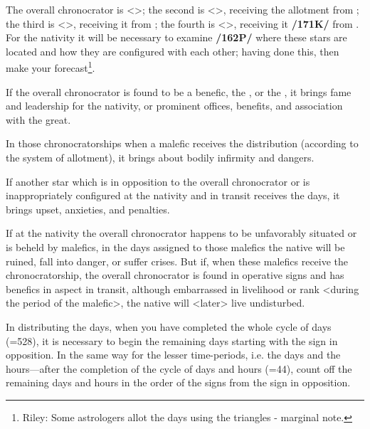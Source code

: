 The overall chronocrator is \Jupiter\xspace <\Pisces>; the second is \Mercury\xspace <\Gemini>, receiving the allotment from \Jupiter; the third is \Mars <\Scorpio>, receiving it from \Mercury; the fourth is \Venus <\Taurus>, receiving it \textbf{/171K/} from \Mars. For the nativity it will be necessary to examine \textbf{/162P/} where these stars are located and how they are configured with each other; having done this, then make your forecast\footnote{Riley: Some astrologers allot the days using the triangles - marginal note.}.

If the overall chronocrator is found to be a benefic, the \Sun, or the \Moon, it brings fame and leadership for the nativity, or prominent offices, benefits, and association with the great. 

In those chronocratorships when a malefic receives the distribution (according to the system of allotment), it brings about bodily infirmity and dangers. 

If another star which is in opposition to the overall chronocrator or is inappropriately configured at the nativity and in transit receives the days, it brings upset, anxieties, and penalties. 

If at the nativity the overall chronocrator happens to be unfavorably situated or is beheld by malefics, in the days assigned to those malefics the native will be ruined, fall into danger, or suffer crises. But if, when these malefics receive the chronocratorship, the overall chronocrator is found in operative signs and has benefics in aspect in transit, although embarrassed in livelihood or rank <during the period of the malefic>, the native will <later> live undisturbed.

In distributing the days, when you have completed the whole cycle of days (=528), it is necessary to begin the remaining days starting with the sign in opposition. In the same way for the lesser time-periods, i.e. the days and the hours—after the completion of the cycle of days and hours (=44), count off the
remaining days and hours in the order of the signs from the sign in opposition.

\newpage
